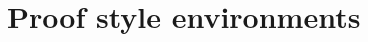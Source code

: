 \documentclass{article}
\begin{document}
\section{Proof style environments}

\begin{solution}\leavevmode
\begin{verbatim*}
\begin{solution}
\end{solution}
\end{verbatim*}
\end{solution}

\begin{solution}[1]\leavevmode
\begin{verbatim*}
\begin{solution}[1]
\end{solution}
\end{verbatim*}
\end{solution}
\end{document}
